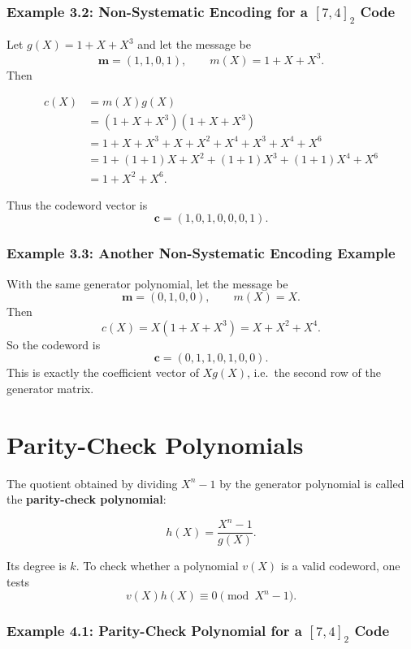 \documentclass[11pt,oneside]{book}
\theoremstyle{plain}
\theoremstyle{definition}
\theoremstyle{remark}
\begin{document}
\subsubsection{\texorpdfstring{Example 3.2: Non-Systematic Encoding for
a \([7,4]_2\)
Code}{Example 3.2: Non-Systematic Encoding for a {[}7,4{]}\_2 Code}}\label{example-3.2-non-systematic-encoding-for-a-74_2-code}

Let \(g(X)=1+X+X^3\) and let the message be
\[\mathbf{m}=(1,1,0,1), \qquad m(X)=1+X+X^3.\] Then

\[\begin{aligned}
c(X)
&= m(X)g(X) \\
&= (1+X+X^3)(1+X+X^3) \\
&= 1+X+X^3 + X+X^2+X^4 + X^3+X^4+X^6 \\
&= 1 + (1+1)X + X^2 + (1+1)X^3 + (1+1)X^4 + X^6 \\
&= 1 + X^2 + X^6.
\end{aligned}\]

Thus the codeword vector is \[\mathbf{c}=(1,0,1,0,0,0,1).\]

\subsubsection{Example 3.3: Another Non-Systematic Encoding
Example}\label{example-3.3-another-non-systematic-encoding-example}

With the same generator polynomial, let the message be
\[\mathbf{m}=(0,1,0,0), \qquad m(X)=X.\] Then
\[c(X)=X(1+X+X^3)=X+X^2+X^4.\] So the codeword is
\[\mathbf{c}=(0,1,1,0,1,0,0).\] This is exactly the coefficient vector
of \(Xg(X)\), i.e.~the second row of the generator matrix.


\section{Parity-Check Polynomials}\label{sec:parity-check-polynomials}

The quotient obtained by dividing \(X^n-1\) by the generator polynomial
is called the \textbf{parity-check polynomial}:

\[h(X)=\frac{X^n-1}{g(X)}.\]

Its degree is \(k\). To check whether a polynomial \(v(X)\) is a valid
codeword, one tests \[v(X)h(X) \equiv 0 \pmod{X^n-1}.\]

\subsubsection{\texorpdfstring{Example 4.1: Parity-Check Polynomial for
a \([7,4]_2\)
Code}{Example 4.1: Parity-Check Polynomial for a {[}7,4{]}\_2 Code}}\label{example-4.1-parity-check-polynomial-for-a-74_2-code}
\end{document}
